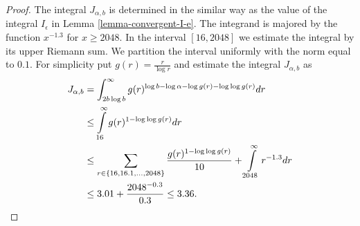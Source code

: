 \begin{proof}
The integral $J_{\alpha, b}$ is determined in the similar way as the value of the integral $I_\epsilon$ in Lemma \ref{lemma-convergent-I-e}. The integrand is majored by the function $x ^ {-1.3}$ for $x \geq 2048$. In the interval $[16, 2048]$ we estimate the integral by its upper Riemann sum. We partition the interval uniformly with the norm equal to $0.1$. For simplicity put $g(r) = \frac{r}{\log r}$ and estimate the integral $J_{\alpha, b}$ as
\[
\begin{split}
J_{\alpha, b} 
	& = \int_{2 b \log b}^{\infty} g(r) ^ {\log b - \log \alpha - \log g(r) - \log \log g(r)} dr \\
	& \leq \int\limits_{16}^{\infty} g(r) ^ {1 - \log \log g(r)} dr \\
	& \leq \sum\displaylimits_{r \in \{16, 16.1, \dots, 2048 \}} \frac{g(r) ^ {1 - \log \log g(r)}}{10} + 
		\int\limits_{2048}^{\infty} r ^ {-1.3} dr \\
	& \leq 3.01 + \frac{2048 ^ {-0.3}}{0.3} \leq 3.36 \text{.}
\end{split}
\]
\end{proof}